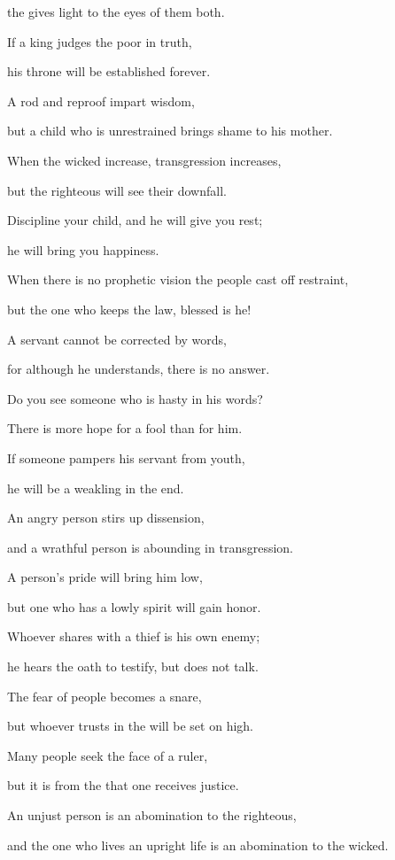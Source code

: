{\par }{\Q the {}
gives light
to the eyes
of them both.
\par }{\Q {}If a king
judges
the poor
in truth,
\par }{\Q his throne
will be established
forever.
\par }{\Q {}A rod
and reproof
impart
wisdom,
\par }{\Q but a child
who is unrestrained
brings shame
to his mother.
\par }{\Q {}When
the wicked
increase,
transgression
increases,
\par }{\Q but the righteous
will see
their downfall.
\par }{\Q {}Discipline
your child,
and he will give
you rest;
\par }{\Q he will bring you happiness.
\par }{\Q {}When there is no
prophetic
vision
the people
cast off restraint,

\par }{\Q but
the one who keeps
the law,
blessed is he!
\par }{\Q {}A servant
cannot
be corrected
by words,
\par }{\Q for although
he understands,
there is no
answer.
\par }{\Q {}Do you see
someone
who is hasty
in his words?

\par }{\Q There is more hope
for a fool
than for him.
\par }{\Q {}If someone pampers
his servant
from youth,
\par }{\Q he will be
a weakling
in the end.
\par }{\Q {}An
angry
person stirs
up dissension,
\par }{\Q and a wrathful
person is abounding
in transgression.
\par }{\Q {}A person’s
pride
will bring
him low,
\par }{\Q but one who has a lowly
spirit
will gain
honor.
\par }{\Q {}Whoever shares
with
a thief
is his own enemy;

\par }{\Q he hears
the oath
to testify, but
does not
talk.
\par }{\Q {}The fear
of people
becomes a snare,
\par }{\Q but whoever trusts
in the
{}
will be set on high.
\par }{\Q {}Many
people seek
the face
of a ruler,
\par }{\Q but it is from the
{}
that one
receives justice.
\par }{\Q {}An unjust person
is an abomination
to the righteous,
\par }{\Q and the one
who lives
an upright
life is an abomination
to the wicked.

}
